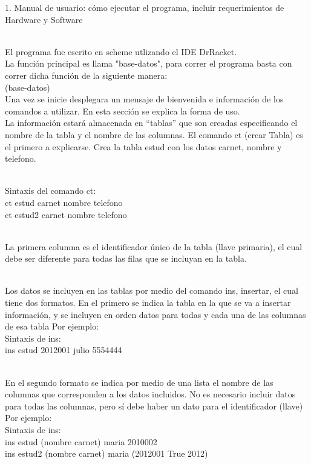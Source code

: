 \documentclass[12pt,a4paper]{report}
\begin{document}
\begin{flushleft}

1. Manual de usuario: cómo ejecutar el programa, incluir requerimientos de Hardware y Software\\\

El programa fue escrito en scheme utlizando el IDE DrRacket.\\
La función principal es llama "base-datos", para correr el programa basta con correr dicha función de la siguiente manera:\\
(base-datos)\\
Una vez se inicie desplegara un mensaje de bienvenida e información de los comandos a utilizar. En esta sección se explica la forma de uso.\\

La información estará almacenada en “tablas” que son creadas especificando el nombre de la tabla y el nombre de las columnas. El comando ct (crear Tabla) es el primero a explicarse. Crea la tabla estud con los datos carnet, nombre y telefono.\\\

Sintaxis del comando ct:\\
ct estud carnet nombre telefono\\
ct estud2 carnet nombre telefono \\\

La primera columna es el identificador único de la tabla (llave primaria), el cual debe ser diferente para todas las filas que se incluyan en la tabla.\\\

Los datos se incluyen en las tablas por medio del comando ins, insertar, el cual tiene dos formatos. En el primero se indica la tabla en la que se va a 
insertar información, y se incluyen en orden datos para todas y cada una de las columnas de esa tabla Por ejemplo:\\
Sintaxis de ins:\\
ins estud 2012001 julio 5554444\\\

En el segundo formato se indica por medio de una lista el nombre de las columnas que corresponden a los datos incluidos. No es necesario incluir datos para todas las
columnas, pero sí debe haber un dato para el identificador (llave) Por ejemplo:\\
Sintaxis de ins:\\
ins estud (nombre carnet) maria 2010002 \\
ins estud2 (nombre carnet) maria (2012001 True 2012)\\\


\end{flushleft}
\end{document}
